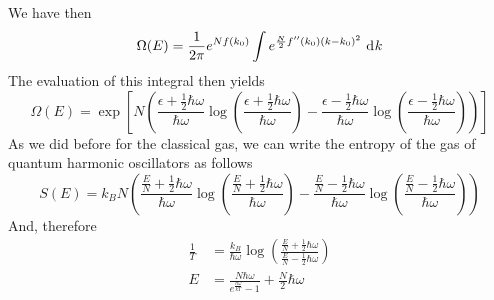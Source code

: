\documentclass[../qm.tex]{subfiles}
\begin{document}
		We have then
		\begin{equation}
			\Omega(E)=\frac{1}{2\pi}e^{Nf(k_0)}\int e^{\frac{N}{2}f''(k_0)(k-k_0)^2}\ \mathrm{d}^{}k
			\label{eq:Omegaesaddlepointmethod}
		\end{equation}
		The evaluation of this integral then yields
		\begin{equation}
			\Omega(E)=\exp\left[ N\left( \frac{\epsilon+\frac{1}{2}\hbar\omega}{\hbar\omega}\log\left( \frac{\epsilon+\frac{1}{2}\hbar\omega}{\hbar\omega} \right)-\frac{\epsilon-\frac{1}{2}\hbar\omega}{\hbar\omega}\log\left( \frac{\epsilon-\frac{1}{2}\hbar\omega}{\hbar\omega} \right) \right) \right]
			\label{eq:omegaenqhocomplete}
		\end{equation}
		As we did before for the classical gas, we can write the entropy of the gas of quantum harmonic oscillators as follows
		\begin{equation}
			S(E)=k_BN\left( \frac{\frac{E}{N}+\frac{1}{2}\hbar\omega}{\hbar\omega}\log\left( \frac{\frac{E}{N}+\frac{1}{2}\hbar\omega}{\hbar\omega} \right)-\frac{\frac{E}{N}-\frac{1}{2}\hbar\omega}{\hbar\omega}\log\left( \frac{\frac{E}{N}-\frac{1}{2}\hbar\omega}{\hbar\omega} \right) \right)
			\label{eq:qhoentropy}
		\end{equation}
		And, therefore
		\begin{equation}
			\begin{aligned}
				\frac{1}{T}&=\frac{k_B}{\hbar\omega}\log\left( \frac{\frac{E}{N}+\frac{1}{2}\hbar\omega}{\frac{E}{N}-\frac{1}{2}\hbar\omega} \right)\\
				E&=\frac{N\hbar\omega}{e^{\frac{\hbar\omega}{kT}}-1}+\frac{N}{2}\hbar\omega
			\end{aligned}
			\label{eq:tempenergyqho}
		\end{equation}
\end{document}
